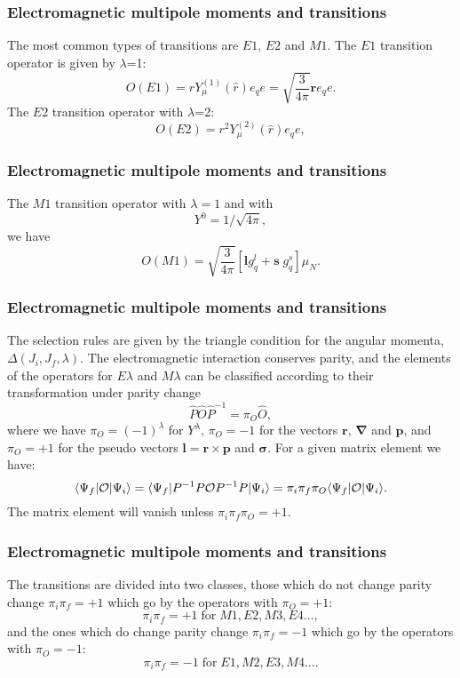\documentclass{beamer}
\begin{document}
\begin{frame}
\frametitle{Electromagnetic multipole moments and transitions}

\begin{block}{}
The most common types of transitions are $E1$, $E2$ and $M1$.
The $E1$ transition operator is given by $\lambda$=1:
\[
O(E1) = rY^{(1)}_{\mu }(\hat{r})e_{q} e= \sqrt{\frac{3}{4\pi }}\mathbf{r}e_{q} e.
\]
The $E2$ transition operator with $\lambda$=2:
\[
O(E2) = r^{2}Y^{(2)}_{\mu }(\hat{r})e_{q} e,  
\]
\end{block}
\end{frame}

\begin{frame}
\frametitle{Electromagnetic multipole moments and transitions}

\begin{block}{}
The $M1$ transition operator with $\lambda=1$ and with
\[
  Y^{0}=1/\sqrt{4\pi },
\]
we have
\[
O(M1)=\sqrt{\frac{3}{4\pi }}[\mathbf{l}g^{l }_{q}+\mathbf{s} \; g^{s}_{q}]\mu _{N}. 
\]
\end{block}
\end{frame}

\begin{frame}
\frametitle{Electromagnetic multipole moments and transitions}

\begin{block}{}
The selection rules are given by the triangle condition for the
angular momenta, $  \Delta (J_{i},J_{f},\lambda )  $. The electromagnetic
interaction conserves parity, and the elements of the
operators for $  E\lambda   $ and $  M\lambda   $
can be classified according to their transformation under parity
change
\[
\hat{P}\hat{O}\hat{P}^{-1}=\pi_{O}\hat{O}, 
\]
where we have $\pi _{O}=(-1)^{\lambda }$ for $Y^{\lambda }$,
$\pi _{O}=-1$ for the vectors
$\mathbf{r}$, $\mathbf{\nabla}$ and $\mathbf{p}$, and $  \pi _{O}=+1  $ for the 
pseudo vectors
$\mathbf{l}=\mathbf{r}\times\mathbf{p}$ and $\mathbf{\sigma}$. For a given matrix element we have:
\[
\langle\Psi _{f}\vert {\cal O}\vert \Psi _{i}\rangle =\langle\Psi _{f}\vert P^{-1}P{\cal O}P^{-1}P\vert \Psi _{i}\rangle=\pi _{i}\pi _{f}\pi _{O} \langle\Psi _{f}\vert {\cal O}\vert \Psi _{i}\rangle. 
\]
The matrix element will vanish unless  $\pi _{i}\pi _{f}\pi _{O}=+1$.

\end{block}
\end{frame}

\begin{frame}
\frametitle{Electromagnetic multipole moments and transitions}

\begin{block}{}
The transitions are divided into two classes, those
which do not change parity change $\pi _{i}\pi _{f}=+1$ which go by the
operators with $\pi _{O}=+1$:
\[
\pi _{i}\pi _{f}=+1 \; \mathrm{for} \; M1, E2, M3, E4 \dots,
\]
and the ones which do change parity change $\pi _{i}\pi _{f}=-1$
which go by the operators with $\pi _{O}=-1$:
\[
\pi _{i}\pi _{f}=-1 \; \mathrm{for} \; E1, M2, E3, M4 \dots.
\]

\end{block}
\end{frame}
\end{document}
